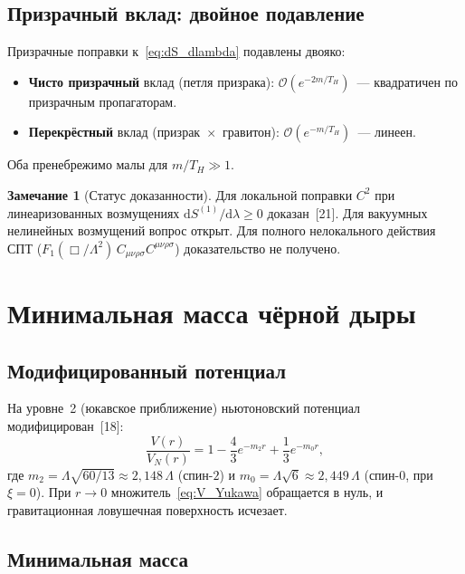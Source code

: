 \documentclass[12pt,a4paper]{article}
\newcommand{\dd}{\mathrm{d}}
\newcommand{\order}{\mathcal{O}}
\newcommand{\Lam}{\Lambda}
\newcommand{\Thr}{T_{\!H}}
\newcommand{\Weylsq}{C_{\mu\nu\rho\sigma}C^{\mu\nu\rho\sigma}}
\theoremstyle{plain}
\theoremstyle{definition}
\newtheorem{remark}[theorem]{Замечание}
\begin{document}
\subsection{Призрачный вклад: двойное подавление}

Призрачные поправки к~\eqref{eq:dS_dlambda} подавлены двояко:
\begin{itemize}
  \item \textbf{Чисто призрачный} вклад (петля призрака):
    $\order(e^{-2m/\Thr})$~--- квадратичен по призрачным пропагаторам.
  \item \textbf{Перекрёстный} вклад (призрак~$\times$~гравитон):
    $\order(e^{-m/\Thr})$~--- линеен.
\end{itemize}
Оба пренебрежимо малы для $m/\Thr \gg 1$.

\begin{remark}[Статус доказанности]
Для локальной поправки $C^2$ при линеаризованных возмущениях
$\dd S^{(1)}/\dd\lambda \geq 0$ доказан~[21]. Для вакуумных
нелинейных возмущений вопрос открыт. Для полного нелокального
действия СПТ ($F_1(\Box/\Lam^2)\,\Weylsq$) доказательство
не получено.
\end{remark}

\section{Минимальная масса чёрной дыры}\label{sec:Mmin}

\subsection{Модифицированный потенциал}

На уровне~2 (юкавское приближение) ньютоновский потенциал
модифицирован~[18]:
\begin{equation}\label{eq:V_Yukawa}
  \frac{V(r)}{V_N(r)} = 1 - \frac{4}{3}e^{-m_2 r}
  + \frac{1}{3}e^{-m_0 r},
\end{equation}
где $m_2 = \Lam\sqrt{60/13} \approx 2{,}148\,\Lam$
(спин-$2$) и $m_0 = \Lam\sqrt{6} \approx 2{,}449\,\Lam$
(спин-$0$, при $\xi = 0$). При $r \to 0$ множитель~\eqref{eq:V_Yukawa}
обращается в нуль, и гравитационная ловушечная поверхность исчезает.

\subsection{Минимальная масса}
\end{document}
